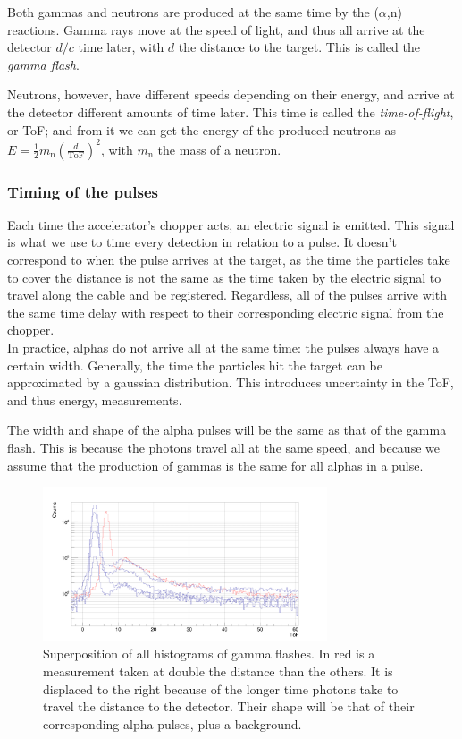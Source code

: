 \documentclass[a4paper,12pt]{report}
\newcommand{\an}{($\alpha$,n) }
\begin{document}
Both gammas and neutrons are produced at the same time by the \an reactions.	%
Gamma rays move at the speed of light, and thus all arrive at the detector $d/c$ time later, with $d$ the distance to the target.
This is called the \textit{gamma flash}.

Neutrons, however, have different speeds depending on their energy, and arrive at the detector different amounts of time later.
This time is called the \textit{time-of-flight}, or ToF; and from it we can get the energy of the produced neutrons as $E=\frac{1}{2} m_\text{n} \left( \frac{d}{\text{ToF}} \right)^2$, with $m_\text{n}$ the mass of a neutron.
\\

\subsubsection{Timing of the pulses}
Each time the accelerator's chopper acts, an electric signal is emitted.	%
This signal is what we use to time every detection in relation to a pulse.
It doesn't correspond to when the pulse arrives at the target, as the time the particles take to cover the distance is not the same as the time taken by the electric signal to travel along the cable and be registered.
Regardless, all of the pulses arrive with the same time delay with respect to their corresponding electric signal from the chopper.
\\

In practice, alphas do not arrive all at the same time: the pulses always have a certain width.
Generally, the time the particles hit the target can be approximated by a gaussian distribution.
This introduces uncertainty in the ToF, and thus energy, measurements.

The width and shape of the alpha pulses will be the same as that of the gamma flash.
This is because the photons travel all at the same speed, and because we assume that the production of gammas is the same for all alphas in a pulse.
\\

\begin{figure}[H]
	\centering
	\includegraphics[width=0.75\textwidth]{uneven_gflash.png}
	\caption{Superposition of all histograms of gamma flashes.
	In red is a measurement taken at double the distance than the others.
	It is displaced to the right because of the longer time photons take to travel the distance to the detector.
	Their shape will be that of their corresponding alpha pulses, plus a background.}
	\label{uneven_gflash}
\end{figure}
\end{document}
